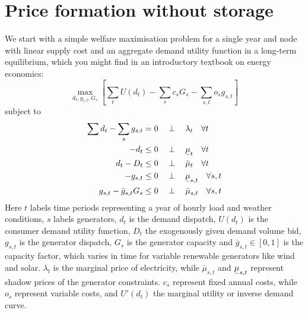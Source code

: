\documentclass[final,3p]{elsarticle}
\def\l{\lambda} \def\K{\kappa} \def\m{\mu} \def\G{\Gamma} \def\d{\partial}
\begin{document}
\newpage
\section*{Price formation without storage}\label{sec:generators}

We start with a simple welfare maximisation problem for a single year and node
with linear supply cost and an aggregate demand utility function in a long-term
equilibrium, which you might find in an introductory textbook on energy
economics:
\begin{equation}
  \max_{d_{t}, g_{s,t}, G_s}\left[\sum_{t} U(d_t) -  \sum_s c_s G_s - \sum_{s,t} o_{s} g_{s,t}\right]  \label{eq:objl}
\end{equation}
subject to
\begin{align}
  \sum d_{t} - \sum_s g_{s,t} & =  0 \hspace{0.34cm}\perp \hspace{0.34cm} \l_t \hspace{0.34cm} \forall t \label{eq:balance} \\
  -d_{t}                        & \leq 0 \hspace{0.34cm}\perp \hspace{0.34cm} \ubar{\mu}_{t} \hspace{0.34cm} \forall t  \label{eq:dem-lower}  \\
  d_{t} - D_{t}               & \leq 0 \hspace{0.34cm}\perp \hspace{0.34cm} \bar{\mu}_{t} \hspace{0.34cm} \forall t   \label{eq:dem-upper}  \\
  -g_{s,t}                        & \leq 0 \hspace{0.34cm}\perp \hspace{0.34cm} \ubar{\mu}_{s,t} \hspace{0.34cm} \forall s,t   \label{eq:gen-lower} \\
  g_{s,t} - \bar{g}_{s,t} G_s     & \leq 0 \hspace{0.34cm}\perp \hspace{0.34cm} \bar{\mu}_{s,t} \hspace{0.34cm} \forall s,t \label{eq:gen-upper}
\end{align}
Here $t$ labels time periods representing a year of hourly load and weather
conditions, $s$ labels generators, $d_{t}$ is the demand dispatch, $U(d_t)$ is
the consumer demand utility function, $D_{t}$ the exogenously given demand
volume bid, $g_{s,t}$ is the generator dispatch, $G_s$ is the generator capacity
and $\bar{g}_{s,t}\in[0,1]$ is the capacity factor, which varies in time for
variable renewable generators like wind and solar. $\l_t$ is the marginal price
of electricity, while $\bar{\mu}_{s,t}$ and $\ubar{\mu}_{s,t}$ represent shadow
prices of the generator constraints. $c_s$ represent fixed annual costs, while
$o_s$ represent variable costs, and $U'(d_t)$ the marginal utility or inverse
demand curve.
\end{document}
